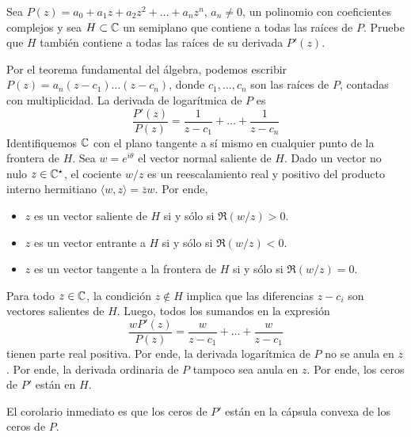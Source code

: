 \begin{exercise}
Sea $P(z) = a_0 + a_1 z + a_2 z^2 + \dots + a_n z^n$, $a_n \ne 0$, un polinomio con coeficientes complejos y sea $H \subset \mathbb C$ un semiplano que contiene a todas las raíces de $P$. Pruebe que $H$ también contiene a todas las raíces de su derivada $P'(z)$.
\end{exercise}

\begin{solution}
Por el teorema fundamental del álgebra, podemos escribir $P(z) = a_n (z - c_1) \dots (z - c_n)$, donde $c_1, \dots, c_n$ son las raíces de $P$, contadas con multiplicidad. La derivada de logarítmica de $P$ es
$$\frac {P'(z)} {P(z)} = \frac 1 {z - c_1} + \dots + \frac 1 {z - c_n}$$
Identifiquemos $\mathbb C$ con el plano tangente a sí mismo en cualquier punto de la frontera de $H$. Sea $w = e^{i\theta}$ el vector normal saliente de $H$. Dado un vector no nulo $z \in \mathbb C^\star$, el cociente $w/z$ es un reescalamiento real y positivo del producto interno hermitiano $\langle w, z \rangle = \bar zw$. Por ende,
\begin{itemize}
    \item $z$ es un vector saliente de $H$ si y sólo si $\Re(w/z) > 0$.
    \item $z$ es un vector entrante a $H$ si y sólo si $\Re(w/z) < 0$.
    \item $z$ es un vector tangente a la frontera de $H$ si y sólo si $\Re(w/z) = 0$.
\end{itemize}
Para todo $z \in \mathbb C$, la condición $z \notin H$ implica que las diferencias $z - c_i$ son vectores salientes de $H$. Luego, todos los sumandos en la expresión
$$\frac {wP'(z)} {P(z)} = \frac w {z - c_1} + \dots + \frac w {z - c_1}$$
tienen parte real positiva. Por ende, la derivada logarítmica de $P$ no se anula en $z$. Por ende, la derivada ordinaria de $P$ tampoco sea anula en $z$. Por ende, los ceros de $P'$ están en $H$.
\end{solution}

\begin{remark}
El corolario inmediato es que los ceros de $P'$ están en la cápsula convexa de los ceros de $P$.
\end{remark}
